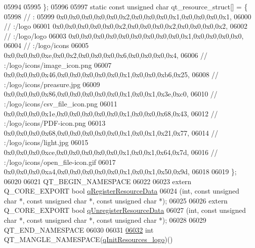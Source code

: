 \begin{DoxyCode}
05994   
05995 \};
05996 
05997 \textcolor{keyword}{static} \textcolor{keyword}{const} \textcolor{keywordtype}{unsigned} \textcolor{keywordtype}{char} qt\_resource\_struct[] = \{
05998   \textcolor{comment}{// :}
05999   0x0,0x0,0x0,0x0,0x0,0x2,0x0,0x0,0x0,0x1,0x0,0x0,0x0,0x1,
06000   \textcolor{comment}{// :/logo}
06001   0x0,0x0,0x0,0x0,0x0,0x2,0x0,0x0,0x0,0x2,0x0,0x0,0x0,0x2,
06002   \textcolor{comment}{// :/logo/logo}
06003   0x0,0x0,0x0,0x0,0x0,0x0,0x0,0x0,0x0,0x1,0x0,0x0,0x0,0x0,
06004   \textcolor{comment}{// :/logo/icons}
06005   0x0,0x0,0x0,0xe,0x0,0x2,0x0,0x0,0x0,0x6,0x0,0x0,0x0,0x4,
06006   \textcolor{comment}{// :/logo/icons/image\_icon.png}
06007   0x0,0x0,0x0,0x46,0x0,0x0,0x0,0x0,0x0,0x1,0x0,0x0,0xb6,0x25,
06008   \textcolor{comment}{// :/logo/icons/preasure.jpg}
06009   0x0,0x0,0x0,0x86,0x0,0x0,0x0,0x0,0x0,0x1,0x0,0x1,0x3e,0xc0,
06010   \textcolor{comment}{// :/logo/icons/csv\_file\_icon.png}
06011   0x0,0x0,0x0,0x1e,0x0,0x0,0x0,0x0,0x0,0x1,0x0,0x0,0x68,0x43,
06012   \textcolor{comment}{// :/logo/icons/PDF-icon.png}
06013   0x0,0x0,0x0,0x68,0x0,0x0,0x0,0x0,0x0,0x1,0x0,0x1,0x21,0x77,
06014   \textcolor{comment}{// :/logo/icons/light.jpg}
06015   0x0,0x0,0x0,0xce,0x0,0x0,0x0,0x0,0x0,0x1,0x0,0x1,0x64,0x7d,
06016   \textcolor{comment}{// :/logo/icons/open\_file-icon.gif}
06017   0x0,0x0,0x0,0xa4,0x0,0x0,0x0,0x0,0x0,0x1,0x0,0x1,0x50,0x9d,
06018 
06019 \};
06020 
06021 QT\_BEGIN\_NAMESPACE
06022 
06023 \textcolor{keyword}{extern} Q\_CORE\_EXPORT \textcolor{keywordtype}{bool} \hyperlink{a00126_ab3bec3d1e679084be46edc41e4c91bc1}{qRegisterResourceData}
06024     (\textcolor{keywordtype}{int}, \textcolor{keyword}{const} \textcolor{keywordtype}{unsigned} \textcolor{keywordtype}{char} *, \textcolor{keyword}{const} \textcolor{keywordtype}{unsigned} \textcolor{keywordtype}{char} *, \textcolor{keyword}{const} \textcolor{keywordtype}{unsigned} \textcolor{keywordtype}{char} *);
06025 
06026 \textcolor{keyword}{extern} Q\_CORE\_EXPORT \textcolor{keywordtype}{bool} \hyperlink{a00126_ad65f8bca8010dd1fd135a28a085c6d03}{qUnregisterResourceData}
06027     (\textcolor{keywordtype}{int}, \textcolor{keyword}{const} \textcolor{keywordtype}{unsigned} \textcolor{keywordtype}{char} *, \textcolor{keyword}{const} \textcolor{keywordtype}{unsigned} \textcolor{keywordtype}{char} *, \textcolor{keyword}{const} \textcolor{keywordtype}{unsigned} \textcolor{keywordtype}{char} *);
06028 
06029 QT\_END\_NAMESPACE
06030 
06031 
\hypertarget{a00126_source_l06032}{}\hyperlink{a00126_a26f25d34489dcef5b740853d8506af1c}{06032} \textcolor{keywordtype}{int} QT\_MANGLE\_NAMESPACE(\hyperlink{a00126_a26f25d34489dcef5b740853d8506af1c}{qInitResources\_logo})()

\end{DoxyCode}
